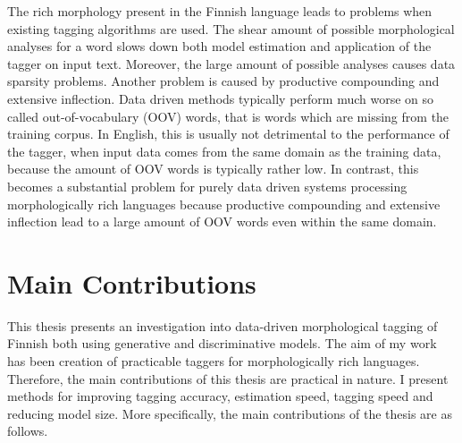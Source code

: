 The rich morphology present in the Finnish language leads to problems
when existing tagging algorithms are used. The shear amount of
possible morphological analyses for a word slows down both model
estimation and application of the tagger on input text. Moreover, the
large amount of possible analyses causes data sparsity
problems. Another problem is caused by productive compounding and
extensive inflection.  Data driven methods typically perform much
worse on so called out-of-vocabulary (OOV) words, that is words which
are missing from the training corpus. In English, this is usually not
detrimental to the performance of the tagger, when input data comes
from the same domain as the training data, because the amount of OOV
words is typically rather low. In contrast, this becomes a substantial
problem for purely data driven systems processing morphologically rich
languages because productive compounding and extensive inflection lead
to a large amount of OOV words even within the same domain.


\section{Main Contributions}

This thesis presents an investigation into data-driven morphological
tagging of Finnish both using generative and discriminative
models. The aim of my work has been creation of practicable taggers
for morphologically rich languages. Therefore, the main contributions
of this thesis are practical in nature. I present methods for
improving tagging accuracy, estimation speed, tagging speed and reducing
model size. More specifically, the main contributions of the thesis
are as follows.

